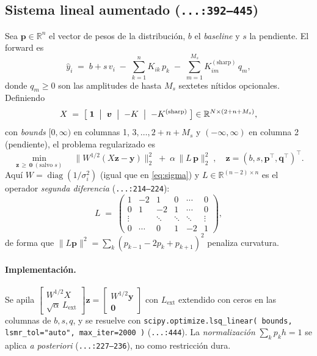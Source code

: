 \documentclass[11pt,a4paper]{article}
\newcommand{\code}[1]{\texttt{\small #1}}
\newcommand{\file}[1]{\textcolor{black!70}{\texttt{\small #1}}}
\DeclareMathOperator{\diag}{diag}
\begin{document}
\subsection{Sistema lineal aumentado (\file{...:392--445})}
Sea $\bm p\in\mathbb R^{n}$ el vector de pesos de la distribución, $b$ el \emph{baseline} y $s$ la pendiente. El forward es
\begin{equation}
  \hat y_i \;=\; b + s\,v_i \;-\; \sum_{k=1}^{n} K_{ik}\,p_k \;-\; \sum_{m=1}^{M_s} K^{(\text{sharp})}_{im}\,q_m,
  \label{eq:fwd_dist}
\end{equation}
donde $q_m\ge 0$ son las amplitudes de hasta $M_s$ sextetes nítidos opcionales. Definiendo
\[
  X \;=\;
  \bigl[\;\bm 1\;\bigm|\;\bm v\;\bigm|\;{-}K\;\bigm|\;{-}K^{(\text{sharp})}\;\bigr]\in\mathbb R^{N\times(2+n+M_s)},
\]
con \emph{bounds} $[0,\infty)$ en columnas 1, $3,\dots,2+n+M_s$ y $(-\infty,\infty)$ en columna 2 (pendiente), el problema regularizado es
\begin{equation}
  \boxed{\;
  \min_{\bm z\,\ge\,\bm 0\;(\text{salvo }s)}\quad
  \bigl\|W^{1/2}(X\bm z - \bm y)\bigr\|_{2}^{2}
  \;+\;\alpha\,\bigl\|L\,\bm p\bigr\|_{2}^{2}\;,
  \quad \bm z=(b,s,\bm p^\top,\bm q^\top)^\top.
  \;}
  \label{eq:tikh}
\end{equation}
Aquí $W=\diag(1/\sigma_i^{2})$ (igual que en \eqref{eq:sigma}) y $L\in\mathbb R^{(n-2)\times n}$ es el operador \emph{segunda diferencia} (\file{...:214--224}):
\begin{equation}
  L \;=\;
  \begin{pmatrix}
    1 & -2 & 1 & 0 & \cdots & 0\\
    0 & 1 & -2 & 1 & \cdots & 0\\
    \vdots & & \ddots & \ddots & \ddots & \vdots\\
    0 & \cdots & 0 & 1 & -2 & 1
  \end{pmatrix},
\end{equation}
de forma que $\|L\bm p\|^{2} = \sum_k (p_{k-1}-2p_k+p_{k+1})^{2}$ penaliza curvatura.

\paragraph{Implementación.} Se apila $\left[\begin{smallmatrix} W^{1/2}X \\ \sqrt\alpha\,L_{\text{ext}} \end{smallmatrix}\right]\bm z = \left[\begin{smallmatrix}W^{1/2}\bm y\\ \bm 0\end{smallmatrix}\right]$ con $L_{\text{ext}}$ extendido con ceros en las columnas de $b,s,q$, y se resuelve con \code{scipy.optimize.lsq\_linear(\,bounds, lsmr\_tol="auto", max\_iter=2000\,)} (\file{...:444}). La \emph{normalización} $\sum_k p_k h = 1$ se aplica \emph{a posteriori} (\file{...:227--236}), no como restricción dura.
\end{document}
